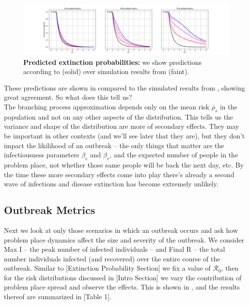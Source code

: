 \documentclass{article}
\begin{document}
\begin{figure}
\centering
\includegraphics[width=\textwidth]{extinction_explained}
\caption{\textbf{Predicted extinction probabilities:} we show predictions
according to  (solid) over simulation
results from  (faint).}
\label{fig:extinction_explained}
\end{figure}




These predictions are shown in  compared
to the simulated results from , showing
great agreement. So what does this tell us?\\


The branching process approximation depends only on the mean risk
$\bar\rho_s$ in the population and not on any other aspects of
the distribution. This tells us the variance and shape of the distribution
are more of secondary effects. They may be important in other contexts (and
we'll see later that they are), but they don't impact the likilihood of an
outbreak – the only things that matter are the infectiousness parameters
$\beta_c$ and $\beta_r$, and the expected number of people in the problem place,
not whether those same people will be back the next day, etc. By the time
these more secondary effects come into play there's already a second
wave of infections and disease extinction has become extremely unlikely.



\subsection{Outbreak Metrics}

Next we look at only those scenarios in which an outbreak occurs and ask how
problem place dynamics affect the size and severity of the outbreak. We consider
Max I – the peak number of infected individuals – and Final R – the total number
individuals infected (and recovered) over the entire course of the outbreak.
Similar to [Extinction Probability Section] we fix a value of $\mathcal{R}_0$, then for
the risk distributions discussed in [Intro Section] we vary the contribution
of problem place spread and observe the effects. This is shown in ,
and the results thereof are summarized in [Table 1].
\end{document}
